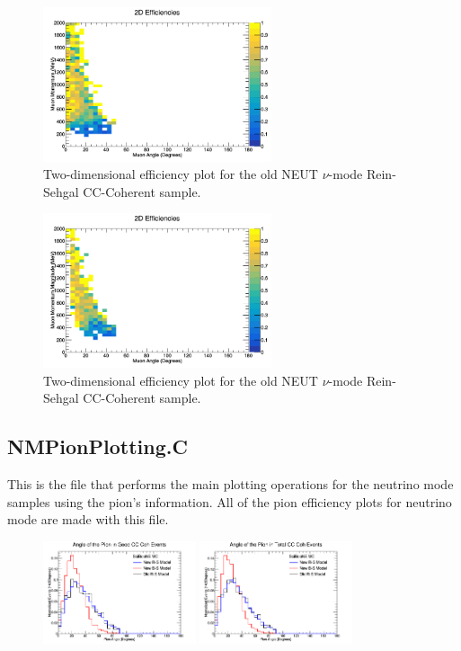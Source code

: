 \documentclass[11pt]{article}
\begin{document}
\begin{figure}[H]
\centering
\includegraphics[width=0.6\textwidth]{CCCohPlots/2DEffNMBS.png}
\caption{Two-dimensional efficiency plot for the old NEUT $\nu$-mode Rein-Sehgal CC-Coherent sample.}
\end{figure}

\begin{figure}[H]
\centering
\includegraphics[width=0.6\textwidth]{CCCohPlots/2DEffNMORS.png}
\caption{Two-dimensional efficiency plot for the old NEUT $\nu$-mode Rein-Sehgal CC-Coherent sample.}
\end{figure}

\subsection{NMPionPlotting.C}
This is the file that performs the main plotting operations for the neutrino mode samples using the pion's information. All of the pion efficiency plots for neutrino mode are made with this file.

\begin{figure}[H]
\centering
\includegraphics[width=0.4\textwidth]{NMPionPlottingImages/7-NMPionPlotting.png}
\includegraphics[width=0.4\textwidth]{NMPionPlottingImages/10-NMPionPlotting.png}
\caption{}
\end{figure}
\end{document}
